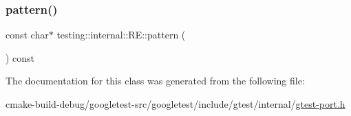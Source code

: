 \subsubsection{\texorpdfstring{pattern()}{pattern()}}
{\footnotesize\ttfamily const char$\ast$ testing\+::internal\+::\+R\+E\+::pattern (\begin{DoxyParamCaption}{ }\end{DoxyParamCaption}) const\hspace{0.3cm}{\ttfamily [inline]}}



The documentation for this class was generated from the following file\+:\begin{DoxyCompactItemize}
\item 
cmake-\/build-\/debug/googletest-\/src/googletest/include/gtest/internal/\mbox{\hyperlink{gtest-port_8h}{gtest-\/port.\+h}}\end{DoxyCompactItemize}
